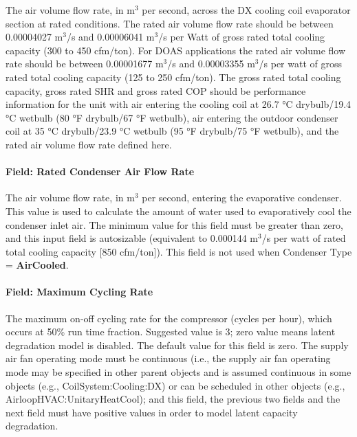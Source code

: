 The air volume flow rate, in m\(^{3}\) per second, across the DX cooling coil evaporator section at rated conditions. The rated air volume flow rate should be between 0.00004027 m\(^{3}\)/s and 0.00006041 m\(^{3}\)/s per Watt of gross rated total cooling capacity (300 to 450 cfm/ton). For DOAS applications the rated air volume flow rate should be between 0.00001677 m\(^{3}\)/s and 0.00003355 m\(^{3}\)/s per watt of gross rated total cooling capacity (125 to 250 cfm/ton). The gross rated total cooling capacity, gross rated SHR and gross rated COP should be performance information for the unit with air entering the cooling coil at 26.7 °C drybulb/19.4 °C wetbulb (80 °F drybulb/67 °F wetbulb), air entering the outdoor condenser coil at 35 °C drybulb/23.9 °C wetbulb (95 °F drybulb/75 °F wetbulb), and the rated air volume flow rate defined here.

\paragraph{Field: Rated Condenser Air Flow Rate}\label{field-rated-condenser-air-flow-rate-2}

The air volume flow rate, in m\(^{3}\) per second, entering the evaporative condenser. This value is used to calculate the amount of water used to evaporatively cool the condenser inlet air. The minimum value for this field must be greater than zero, and this input field is autosizable (equivalent to 0.000144 m\(^{3}\)/s per watt of rated total cooling capacity {[}850 cfm/ton{]}). This field is not used when Condenser Type = \textbf{AirCooled}.

\paragraph{Field: Maximum Cycling Rate}\label{field-maximum-cycling-rate}

The maximum on-off cycling rate for the compressor (cycles per hour), which occurs at 50\% run time fraction. Suggested value is 3; zero value means latent degradation model is disabled. The default value for this field is zero. The supply air fan operating mode must be continuous (i.e., the supply air fan operating mode may be specified in other parent objects and is assumed continuous in some objects (e.g., CoilSystem:Cooling:DX) or can be scheduled in other objects (e.g., AirloopHVAC:UnitaryHeatCool); and this field, the previous two fields and the next field must have positive values in order to model latent capacity degradation.

